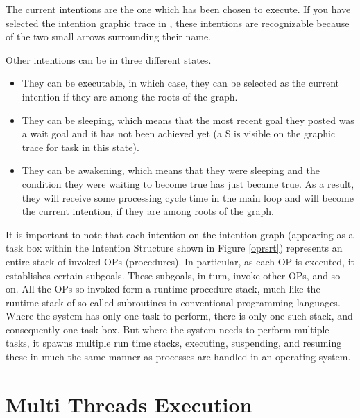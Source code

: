 The current intentions are the one which has been chosen to execute. If
you have selected the intention graphic trace in \XPK{}, these intentions
are recognizable because of the two small arrows surrounding their name.

Other intentions can be in three different states.

\begin{itemize}

\item They can be executable, in which case, they can be selected as the
current intention if they are among the roots of the graph.

\item They can be sleeping, which means that the most recent goal they
posted was a wait goal and it has not been achieved yet (a S is visible on
the graphic trace for task in this state).


\item They can be awakening, which means that they were sleeping and the
condition they were waiting to become true has just became true. As a result, they will 
receive some processing cycle time in the main loop and will become the current
intention, if they are among roots of the graph.

\end{itemize}

It is important to note that each intention on the intention graph
(appearing as a task box within the Intention Structure shown in Figure
\ref{oprsrt}) represents an entire stack of invoked OPs (procedures).  In
particular, as each OP is executed, it establishes certain subgoals.
These subgoals, in turn, invoke other OPs, and so on.  All the OPs so
invoked form a runtime procedure stack, much like the runtime stack of so
called subroutines in conventional programming languages.  Where the
system has only one task to perform, there is only one such stack, and
consequently one task box.  But where the system needs to perform multiple
tasks, it spawns multiple run time stacks, executing, suspending, and
resuming these in much the same manner as processes are handled in an
operating system.

\section{Multi Threads Execution}



